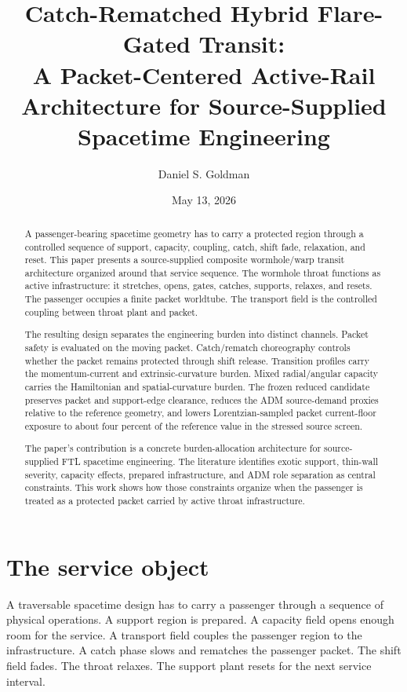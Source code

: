 \documentclass[11pt]{article}
\title{Catch-Rematched Hybrid Flare-Gated Transit:\\A Packet-Centered Active-Rail Architecture for Source-Supplied Spacetime Engineering}
\author[1]{Daniel S. Goldman}
\affil[1]{Independent researcher}
\date{May 13, 2026}
\begin{document}
\maketitle

\begin{abstract}
A passenger-bearing spacetime geometry has to carry a protected region through a controlled sequence of support, capacity, coupling, catch, shift fade, relaxation, and reset. This paper presents a source-supplied composite wormhole/warp transit architecture organized around that service sequence. The wormhole throat functions as active infrastructure: it stretches, opens, gates, catches, supports, relaxes, and resets. The passenger occupies a finite packet worldtube. The transport field is the controlled coupling between throat plant and packet.

The resulting design separates the engineering burden into distinct channels. Packet safety is evaluated on the moving packet. Catch/rematch choreography controls whether the packet remains protected through shift release. Transition profiles carry the momentum-current and extrinsic-curvature burden. Mixed radial/angular capacity carries the Hamiltonian and spatial-curvature burden. The frozen reduced candidate preserves packet and support-edge clearance, reduces the ADM source-demand proxies relative to the reference geometry, and lowers Lorentzian-sampled packet current-floor exposure to about four percent of the reference value in the stressed source screen.

The paper's contribution is a concrete burden-allocation architecture for source-supplied FTL spacetime engineering. The literature identifies exotic support, thin-wall severity, capacity effects, prepared infrastructure, and ADM role separation as central constraints. This work shows how those constraints organize when the passenger is treated as a protected packet carried by active throat infrastructure.
\end{abstract}

\section{The service object}

A traversable spacetime design has to carry a passenger through a sequence of physical operations. A support region is prepared. A capacity field opens enough room for the service. A transport field couples the passenger region to the infrastructure. A catch phase slows and rematches the passenger packet. The shift field fades. The throat relaxes. The support plant resets for the next service interval.
\end{document}
